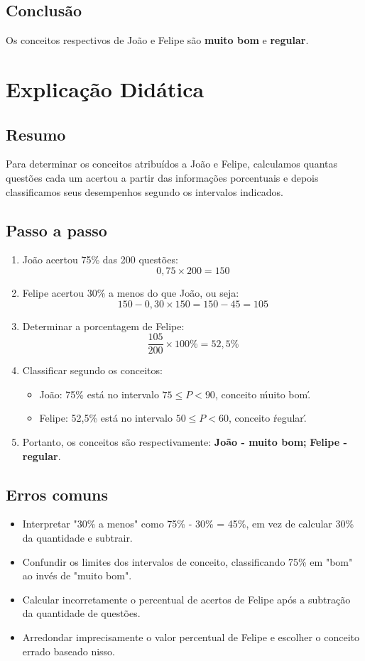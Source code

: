 \documentclass{article}
\begin{document}
\subsection{Conclusão}
Os conceitos respectivos de João e Felipe são \textbf{muito bom} e \textbf{regular}.


\section{Explicação Didática}

\subsection{Resumo}
Para determinar os conceitos atribuídos a João e Felipe, calculamos quantas questões cada um acertou a partir das informações porcentuais e depois classificamos seus desempenhos segundo os intervalos indicados.

\subsection{Passo a passo}
\begin{enumerate}
  \item João acertou 75\% das 200 questões:
  \[
    0{,}75 \times 200 = 150
  \]
  \item Felipe acertou 30\% a menos do que João, ou seja:
  \[
    150 - 0{,}30 \times 150 = 150 - 45 = 105
  \]
  \item Determinar a porcentagem de Felipe:
  \[
    \frac{105}{200} \times 100\% = 52{,}5\%
  \]
  \item Classificar segundo os conceitos:
  \begin{itemize}
    \item João: 75\% está no intervalo $75 \leq P < 90$, conceito \'muito bom\'.
    \item Felipe: 52{,}5\% está no intervalo $50 \leq P < 60$, conceito \'regular\'.
  \end{itemize}
  \item Portanto, os conceitos são respectivamente: \textbf{João - muito bom;} \textbf{Felipe - regular}.
\end{enumerate}

\subsection{Erros comuns}
\begin{itemize}
  \item Interpretar "30\% a menos" como 75\% - 30\% = 45\%, em vez de calcular 30\% da quantidade e subtrair.
  \item Confundir os limites dos intervalos de conceito, classificando 75\% em "bom" ao invés de "muito bom".
  \item Calcular incorretamente o percentual de acertos de Felipe após a subtração da quantidade de questões.
  \item Arredondar imprecisamente o valor percentual de Felipe e escolher o conceito errado baseado nisso.
\end{itemize}
\end{document}
